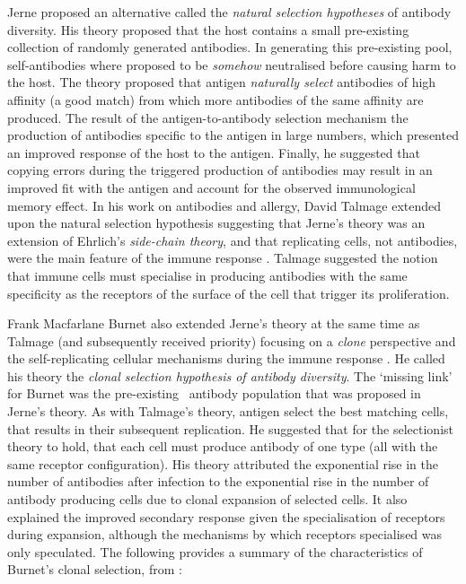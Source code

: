 Jerne proposed an alternative called the \emph{natural selection hypotheses} of antibody diversity. His theory proposed that the host contains a small pre-existing collection of randomly generated antibodies. In generating this pre-existing pool, self-antibodies where proposed to be \emph{somehow} neutralised before causing harm to the host. The theory proposed that antigen \emph{naturally select} antibodies of high affinity (a good match) from which more antibodies of the same affinity are produced. The result of the antigen-to-antibody selection mechanism the production of antibodies specific to the antigen in large numbers, which presented an improved response of the host to the antigen. Finally, he suggested that copying errors during the triggered production of antibodies may result in an improved fit with the antigen and account for the observed immunological memory effect. In his work on antibodies and allergy, David Talmage extended upon the natural selection hypothesis suggesting that Jerne's theory was an extension of Ehrlich's \emph{side-chain theory}, and that replicating cells, not antibodies, were the main feature of the immune response  \cite{Talmage1957}. Talmage suggested the notion that immune cells must specialise in producing antibodies with the same specificity as the receptors of the surface of the cell that trigger its proliferation. 

Frank Macfarlane Burnet also extended Jerne's theory at the same time as Talmage (and subsequently received priority) focusing on a \emph{clone} perspective and the self-replicating cellular mechanisms during the immune response \cite{Burnet1957}. He called his theory the \emph{clonal selection hypothesis of antibody diversity}. The `missing link' for Burnet was the pre-existing \naive\ antibody population that was proposed in Jerne's theory. As with Talmage's theory, antigen select the best matching cells, that results in their subsequent replication. He suggested that for the selectionist theory to hold, that each cell must produce antibody of one type (all with the same receptor configuration). His theory attributed the exponential rise in the number of antibodies after infection to the exponential rise in the number of antibody producing cells due to clonal expansion of selected cells. It also explained the improved secondary response given the specialisation of receptors during expansion, although the mechanisms by which receptors specialised was only speculated. The following provides a summary of the characteristics of Burnet's clonal selection, from \cite{Burnet1978}:

